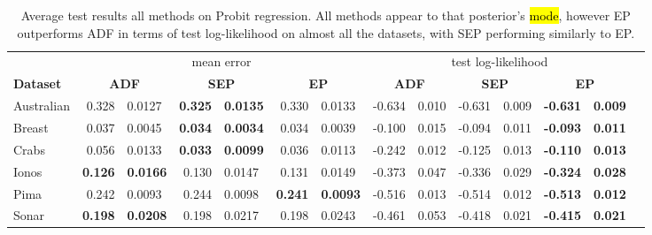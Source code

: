 \begin{table} 
\small
\centering \label{tab:probit_results} 
 \caption{ Average test results all methods on Probit regression. All methods appear to that posterior's \hl{mode}, however EP outperforms ADF in terms of test log-likelihood on almost all the datasets, with SEP performing similarly to EP.}
\begin{tabular}{l@{\ica}r@{$\pm$}l@{\ica}r@{$\pm$}l@{\ica}r@{$\pm$}l@{\ica}r@{$\pm$}l@{\ica}r@{$\pm$}
	l@{\ica}r@{$\pm$}l@{\ica}r@{$\pm$}}\hline 
{} & \multicolumn{6}{c}{mean error} & \multicolumn{6}{c}{test log-likelihood} \\
\bf{Dataset}&\multicolumn{2}{c}{\bf{ ADF }}&\multicolumn{2}{c}{\bf{ SEP }}&\multicolumn{2}{c}{\bf{ EP }} &\multicolumn{2}{c}{\bf{ ADF }}&\multicolumn{2}{c}{\bf{ SEP }}&\multicolumn{2}{c}{\bf{ EP }} \\ \hline 
%
Australian&0.328&0.0127&\bf{0.325}&\bf{0.0135}&0.330&0.0133
	&-0.634&0.010&-0.631&0.009&\bf{-0.631}&\bf{0.009}\\
%
Breast&0.037&0.0045&\bf{0.034}&\bf{0.0034}&0.034&0.0039
	&-0.100&0.015&-0.094&0.011&\bf{-0.093}&\bf{0.011}\\
%
Crabs&0.056&0.0133&\bf{0.033}&\bf{0.0099}&0.036&0.0113
	&-0.242&0.012&-0.125&0.013&\bf{-0.110}&\bf{0.013}\\
%
Ionos&\bf{0.126}&\bf{0.0166}&0.130&0.0147&0.131&0.0149
	&-0.373&0.047&-0.336&0.029&\bf{-0.324}&\bf{0.028}\\
%
Pima&0.242&0.0093&0.244&0.0098&\bf{0.241}&\bf{0.0093}
	&-0.516&0.013&-0.514&0.012&\bf{-0.513}&\bf{0.012}\\
%
Sonar&\bf{0.198}&\bf{0.0208}&0.198&0.0217&0.198&0.0243
	&-0.461&0.053&-0.418&0.021&\bf{-0.415}&\bf{0.021}\\
 \hline \end{tabular} 
 \end{table} 
 

